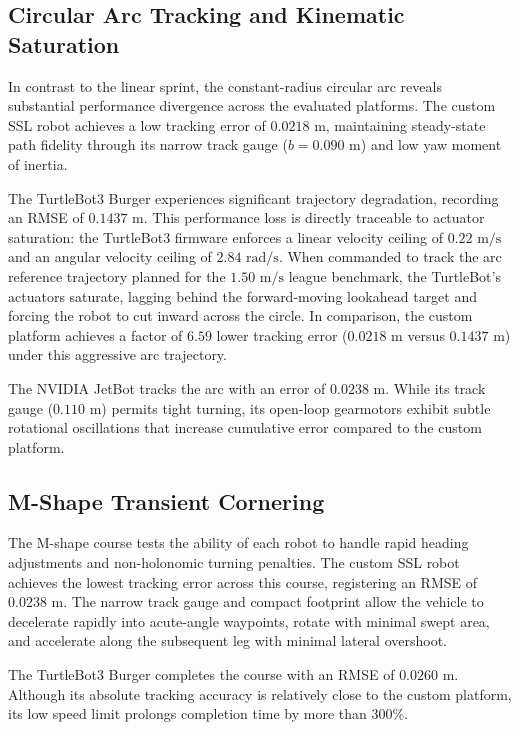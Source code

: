 \documentclass[a4paper,twoside,12pt]{report}
\begin{document}
\subsection{Circular Arc Tracking and Kinematic Saturation}
In contrast to the linear sprint, the constant-radius circular arc reveals substantial performance divergence across the evaluated platforms. The custom SSL robot achieves a low tracking error of $0.0218\text{ m}$, maintaining steady-state path fidelity through its narrow track gauge ($b = 0.090\text{ m}$) and low yaw moment of inertia. 

The TurtleBot3 Burger experiences significant trajectory degradation, recording an RMSE of $0.1437\text{ m}$. This performance loss is directly traceable to actuator saturation: the TurtleBot3 firmware enforces a linear velocity ceiling of $0.22\text{ m/s}$ and an angular velocity ceiling of $2.84\text{ rad/s}$. When commanded to track the arc reference trajectory planned for the $1.50\text{ m/s}$ league benchmark, the TurtleBot's actuators saturate, lagging behind the forward-moving lookahead target and forcing the robot to cut inward across the circle. In comparison, the custom platform achieves a factor of $6.59$ lower tracking error ($0.0218\text{ m}$ versus $0.1437\text{ m}$) under this aggressive arc trajectory.

The NVIDIA JetBot tracks the arc with an error of $0.0238\text{ m}$. While its track gauge ($0.110\text{ m}$) permits tight turning, its open-loop gearmotors exhibit subtle rotational oscillations that increase cumulative error compared to the custom platform.

\subsection{M-Shape Transient Cornering}
The M-shape course tests the ability of each robot to handle rapid heading adjustments and non-holonomic turning penalties. The custom SSL robot achieves the lowest tracking error across this course, registering an RMSE of $0.0238\text{ m}$. The narrow track gauge and compact footprint allow the vehicle to decelerate rapidly into acute-angle waypoints, rotate with minimal swept area, and accelerate along the subsequent leg with minimal lateral overshoot.

The TurtleBot3 Burger completes the course with an RMSE of $0.0260\text{ m}$. Although its absolute tracking accuracy is relatively close to the custom platform, its low speed limit prolongs completion time by more than $300\%$. 
\end{document}
